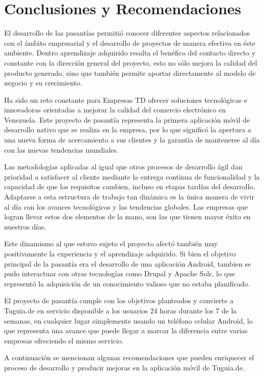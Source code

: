 \chapter{Conclusiones y Recomendaciones}

El desarrollo de las pasantías permitió conocer diferentes aspectos relacionados con el ámbito empresarial y el desarrollo de proyectos de manera efectiva en éste ambiente. Dentro aprendizaje adquirido resalta el benéfico del contacto directo y constante con la dirección general del proyecto, esto no sólo mejora la calidad del producto generado, sino que también permite aportar directamente al modelo de negocio y su crecimiento. 

Ha sido un reto constante para Empresas TD ofrecer soluciones tecnológicas e innovadoras orientadas a mejorar la calidad del comercio electrónico en Venezuela. Este proyecto de pasantía representa la primera aplicación móvil de desarrollo nativo que se realiza en la empresa, por lo que significó la apertura a una nueva forma de acercamiento a sus clientes y la garantía de mantenerse al día con las nuevas tendencias mundiales.

Las metodologías aplicadas al igual que otros procesos de desarrollo ágil dan prioridad a  satisfacer al cliente mediante la entrega continua de funcionalidad y la capacidad de que los requisitos cambien, incluso en etapas tardías del desarrollo. Adaptarse a esta estructura de trabajo tan dinámica es la única manera de vivir al día con los avances tecnológicos y las tendencias globales. Las empresas que logran llevar estos dos elementos de la mano, son las que tienen mayor éxito en nuestros días. 

Este dinamismo al que estuvo sujeto el proyecto afectó también muy positivamente la experiencia y el aprendizaje adquirido. Si bien el objetivo principal de la pasantía era el desarrollo de una aplicación Android, tambien se pudo interactuar con otras tecnologías como Drupal y Apache Solr, lo que representó la adquisición de un conocimiento valioso que no estaba planificado.

El proyecto de pasantía cumple con los objetivos planteados y convierte a Tuguia.de en servicio disponible a los usuarios 24 horas durante los 7 de la semanas, en cualquier lugar simplemente usando un teléfono celular Android, lo que representa una avance que puede llegar a marcar la diferencia entre varias empresas ofreciendo el mismo servicio.

A continuación se mencionan algunas recomendaciones que pueden enriquecer el proceso de desarrollo y producir mejoras en la aplicación móvil de Tuguia.de.
 
